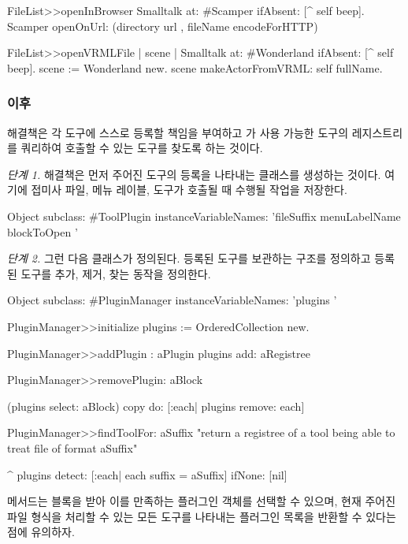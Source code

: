 \documentclass[a4paper,10pt,twoside]{book}
\begin{document}
\begin{code}
FileList>>openInBrowser
	Smalltalk at: #Scamper ifAbsent: [^ self beep].
	Scamper openOnUrl: (directory url , fileName encodeForHTTP)

FileList>>openVRMLFile
	| scene |
	Smalltalk at: #Wonderland ifAbsent: [^ self beep].
	scene := Wonderland new.
	scene makeActorFromVRML: self fullName.
\end{code}

\subsubsection*{이후}

해결책은 각 도구에 스스로 등록할 책임을 부여하고 가 사용 가능한 도구의 레지스트리를 쿼리하여 호출할 수 있는 도구를 찾도록 하는 것이다.

\noindent
\emph{단계 1.}
해결책은 먼저 주어진 도구의 등록을 나타내는  클래스를 생성하는 것이다. 여기에 접미사 파일, 메뉴 레이블, 도구가 호출될 때 수행될 작업을 저장한다.

\begin{code}
Object subclass: #ToolPlugin
	instanceVariableNames: 'fileSuffix menuLabelName blockToOpen '
\end{code}

\noindent
\emph{단계 2.}
그런 다음  클래스가 정의된다. 등록된 도구를 보관하는 구조를 정의하고 등록된 도구를 추가, 제거, 찾는 동작을 정의한다.

\begin{code}
Object subclass: #PluginManager
	instanceVariableNames: 'plugins '

PluginManager>>initialize
	plugins := OrderedCollection new.

PluginManager>>addPlugin : aPlugin
	plugins add: aRegistree

PluginManager>>removePlugin: aBlock

	(plugins select: aBlock) copy 
		do: [:each| plugins remove: each]

PluginManager>>findToolFor: aSuffix
	"return a registree of a tool being able to treat file of format 
	aSuffix"

	^ plugins 
			detect: [:each| each suffix = aSuffix]
			ifNone: [nil]
\end{code}

 메서드는 블록을 받아 이를 만족하는 플러그인 객체를 선택할 수 있으며, 현재 주어진 파일 형식을 처리할 수 있는 모든 도구를 나타내는 플러그인 목록을 반환할 수 있다는 점에 유의하자.
\end{document}
